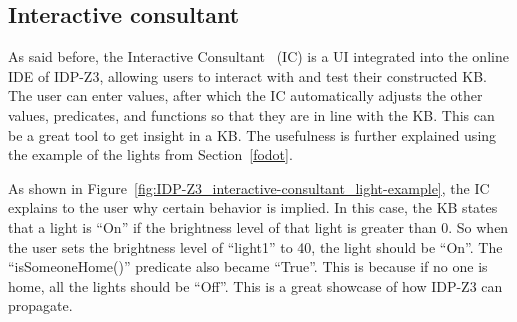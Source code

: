 \documentclass[11pt,a4paper]{report}
\newcommand{\fodot}{FO($\cdot$)\xspace}
\begin{document}

\subsection{Interactive consultant}
\label{interactive_consultant}
As said before, the Interactive Consultant~\cite{InteractiveConsultant} (IC) is a UI integrated into the online IDE of IDP-Z3, allowing users to interact with and test their constructed KB. The user can enter values, after which the IC automatically adjusts the other values, predicates, and functions so that they are in line with the KB. This can be a great tool to get insight in a KB. The usefulness is further explained using the example of the lights from Section~\ref{fodot}.

As shown in Figure~\ref{fig:IDP-Z3_interactive-consultant_light-example}, the IC explains to the user why certain behavior is implied. In this case, the KB states that a light is ``On'' if the brightness level of that light is greater than 0. So when the user sets the brightness level of ``light1'' to 40, the light should be ``On''. The ``isSomeoneHome()'' predicate also became ``True''. This is because if no one is home, all the lights should be ``Off''. This is a great showcase of how IDP-Z3 can propagate.
\end{document}

